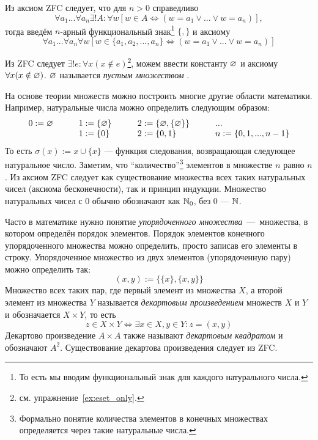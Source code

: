 Из аксиом ZFC следует, что для $n>0$ справедливо
\[
	\forall a_1...\forall a_{n}\exists !A:\forall w
		[w\in A\iff (w=a_1\lor...\lor w=a_{n})],
\]
тогда введём $n$-арный функциональный знак\footnote{
	То есть мы вводим функциональный знак для каждого натурального числа.}
$\{,\}$ и аксиому
\[
	\forall a_1...\forall a_{n}\forall w
	[w\in \{a_1,a_2,...,a_{n}\}\iff (w=a_1\lor ...\lor w=a_{n})]
\]

Из ZFC следует ${\exists !e:\forall x(x\notin e)}$\footnote{
	см. упражнение~\ref{ex:eset_only}.},
можем ввести константу $\varnothing$ и аксиому $\forall x(x\notin \varnothing)$.
$\varnothing$ называется {\it пустым множеством}
.

На основе теории множеств можно построить многие другие области математики.
Например, натуральные числа можно определить следующим образом:
\[ \begin{array}{llll}
		0 :=\varnothing\qquad & 1  :=\{\varnothing\}\qquad & 2  :=\{\varnothing,\{\varnothing\}\}\qquad & ... \\
		                & 1:=\{0\}\qquad       & 2:=\{0,1\}
		                & n:=\{0,1,...,n-1\}
	\end{array}
\]
То есть $\sigma(x):=x\cup \{x\}$ --- функция следования,
возвращающая следующее натуральное число. Заметим, что ``количество''\footnote{
	Формально понятие количества элементов в конечных множествах определяется
	через такие натуральные числа.} элементов
в множестве $n$ равно $n$. Из аксиом ZFC следует как существование множества
всех таких натуральных чисел (аксиома бесконечности), так и принцип индукции.
Множество натуральных чисел с $0$ обычно обозначают как $\mathbb N_0$,
без $0$ --- $\mathbb N$.

Часто в математике нужно понятие {\it упорядоченного множества}~---~множества,
в котором определён порядок элементов. Порядок элементов
конечного упорядоченного множества можно
определить, просто записав его элементы в строку.
Упорядоченное множество из двух элементов (упорядоченную пару)
можно определить так:
\[
	(x,y):=\{\{x\},\{x,y\}\}
\]
Множество
всех таких пар, где первый элемент из множества $X$, а второй элемент
из множества $Y$ называется {\it декартовым произведением}
 множеств
$X$ и $Y$ и
обозначается $X\times Y$, то есть
\[
	z\in X\times Y\iff \exists x\in X,y\in Y:z=(x,y)
\]
Декартово произведение $A\times A$ также называют {\it декартовым квадратом}
и обозначают $A^{2}$. Существование декартова произведения следует из ZFC.

